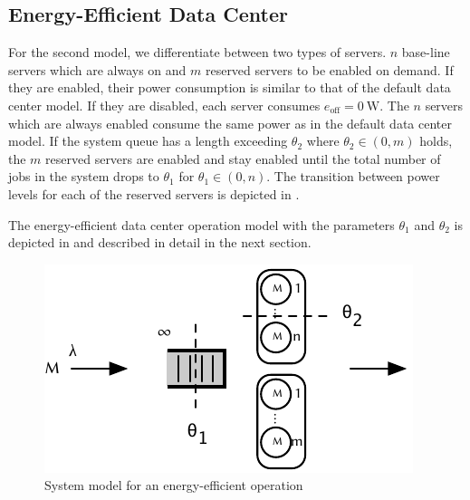 \subsection{Energy-Efficient Data Center}\label{sec:cloud:data_centers:problem_formulation:energy_efficient_data_center}
For the second model, we differentiate between two types of servers.
\(n\) base-line servers which are always on and \(m\) reserved servers to be enabled on demand.
If they are enabled, their power consumption is similar to that of the default data center model.
If they are disabled, each server consumes \(e_\text{off} = \SI{0}{\watt}\).
The \(n\) servers which are always enabled consume the same power as in the default data center model.
If the system queue has a length exceeding \(\theta_2\) where \(\theta_2 \in (0, m)\) holds, the \(m\) reserved servers are enabled and stay enabled until the total number of jobs in the system drops to \(\theta_1\) for \(\theta_1 \in (0, n)\).
The transition between power levels for each of the reserved servers is depicted in .

The energy-efficient data center operation model with the parameters \(\theta_1\) and \(\theta_2\) is depicted in  and described in detail in the next section.

\begin{figure}
  \centering
  \includegraphics{cloud/data_centers/problem_formulation/figures/model}
  \caption{System model for an energy-efficient operation}
  \label{fig:cloud:data_centers:problem_formulation:model}
\end{figure}